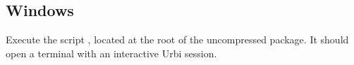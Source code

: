 \subsection{Windows}

Execute the script , located at the root of the
uncompressed package. It should open a terminal with an interactive
Urbi session.


